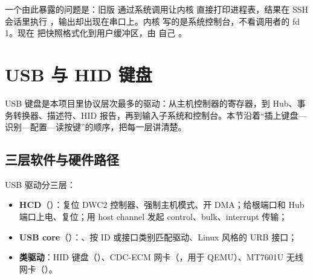 一个由此暴露的问题是：旧版  通过系统调用让内核  直接打印进程表，结果在 SSH 会话里执行 ，输出却出现在串口上。内核  写的是系统控制台，不看调用者的 fd 1。现在  把快照格式化到用户缓冲区，由  自己 。

\section{USB 与 HID 键盘}
\label{sec:usb}

USB 键盘是本项目里协议层次最多的驱动：从主机控制器的寄存器，到 Hub、事务转换器、描述符、HID 报告，再到输入子系统和控制台。本节沿着“插上键盘—识别—配置—读按键”的顺序，把每一层讲清楚。

\subsection{三层软件与硬件路径}

USB 驱动分三层：

\begin{itemize}
  \item \textbf{HCD}（）：复位 DWC2 控制器、强制主机模式、开 DMA；给根端口和 Hub 端口上电、复位；用 host channel 发起 control、bulk、interrupt 传输；
  \item \textbf{USB core}（）：、按 ID 或接口类别匹配驱动、Linux 风格的 URB 接口；
  \item \textbf{类驱动}：HID 键盘（）、CDC-ECM 网卡（，用于 QEMU）、MT7601U 无线网卡（）。
\end{itemize}

